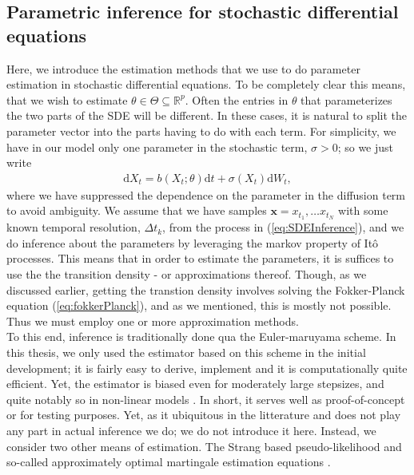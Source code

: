 \subsection{Parametric inference for stochastic differential equations}
Here, we introduce the estimation methods that we use to do parameter estimation in stochastic differential equations. To be completely clear this means, that we wish to estimate $\theta\in\Theta\subseteq\mathbb{R}^p$. Often the entries in $\theta$ that parameterizes the two parts of the SDE will be different. In these cases, it is natural to split the parameter vector into the parts having to do with each term. For simplicity, we have in our model only one parameter in the stochastic term, $\sigma>0$; so we just write
\begin{align}
    \mathrm{d}X_t = b(X_t; \theta)\mathrm{d}t + \sigma\left(X_t\right)\mathrm{d}W_t, \label{eq:SDEInference}
\end{align}
where we have suppressed the dependence on the parameter in the diffusion term to avoid ambiguity. We assume that we have samples $\mathbf{x} = x_{t_1},\dots x_{t_N}$ with some known temporal resolution, $\Delta t_k$, from the process in (\ref{eq:SDEInference}), and we do inference about the parameters by leveraging the markov property of Itô processes. This means that in order to estimate the parameters, it is suffices to use the the transition density - or approximations thereof. Though, as we discussed earlier, getting the transtion density involves solving the Fokker-Planck equation (\ref{eq:fokkerPlanck}), and as we mentioned, this is mostly not possible. Thus we must employ one or more approximation methods.\\
To this end, inference is traditionally done qua the Euler-maruyama scheme. In this thesis, we only used the estimator based on this scheme in the initial development; it is fairly easy to derive, implement and it is computationally quite efficient. Yet, the estimator is biased even for moderately large stepsizes, and quite notably so in non-linear models \cite{SplittingSchemes}. In short, it serves well as proof-of-concept or for testing purposes. Yet, as it ubiquitous in the litterature and does not play any part in actual inference we do; we do not introduce it here. Instead, we consider two other means of estimation. The Strang based pseudo-likelihood \cite{SplittingSchemes} and so-called approximately optimal martingale estimation equations \cite{StatisticalMethodsForSDE}.
